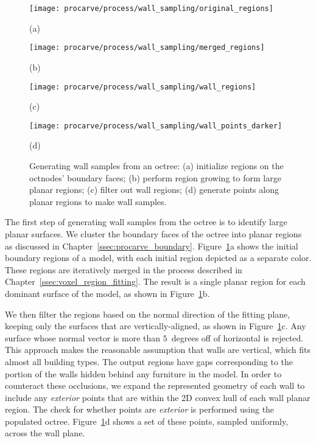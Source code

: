 \documentclass[12pt,onecolumn,oneside]{book}
\begin{document}
\begin{figure}
	\begin{minipage}[t]{0.45\linewidth}
		\centerline{\texttt{[image: procarve/process/wall\_sampling/original\_regions]}}
		\centerline{(a)}
	\end{minipage}
	\hfill
	\begin{minipage}[t]{0.45\linewidth}
		\centerline{\texttt{[image: procarve/process/wall\_sampling/merged\_regions]}}
		\centerline{(b)}
	\end{minipage}
	

	\begin{minipage}[t]{0.45\linewidth}
		\centerline{\texttt{[image: procarve/process/wall\_sampling/wall\_regions]}}
		\centerline{(c)}
	\end{minipage}
	\hfill
	\begin{minipage}[t]{0.45\linewidth}
		\centerline{\texttt{[image: procarve/process/wall\_sampling/wall\_points\_darker]}}
		\centerline{(d)}
	\end{minipage}

	\caption[Generating wall samples from an octree.]{Generating wall samples from an octree: (a) initialize regions on the octnodes' boundary faces; (b) perform region growing to form large planar regions; (c) filter out wall regions; (d) generate points along planar regions to make wall samples.}
	\label{fig:oct2dq}
\end{figure}

The first step of generating wall samples from the octree is to identify large planar surfaces.  We cluster the boundary faces of the octree into planar regions as discussed in Chapter~\ref{ssec:procarve_boundary}.  Figure~\ref{fig:oct2dq}a shows the initial boundary regions of a model, with each initial region depicted as a separate color.  These regions are iteratively merged in the process described in Chapter~\ref{ssec:voxel_region_fitting}.  The result is a single planar region for each dominant surface of the model, as shown in Figure~\ref{fig:oct2dq}b.  

We then filter the regions based on the normal direction of the fitting plane, keeping only the surfaces that are vertically-aligned, as shown in Figure~\ref{fig:oct2dq}c.  Any surface whose normal vector is more than $5$~degrees off of horizontal is rejected.  This approach makes the reasonable assumption that walls are vertical, which fits almost all building types.  The output regions have gaps corresponding to the portion of the walls hidden behind any furniture in the model.  In order to counteract these occlusions, we expand the represented geometry of each wall to include any {\it exterior} points that are within the 2D convex hull of each wall planar region.  The check for whether points are {\it exterior} is performed using the populated octree.  Figure~\ref{fig:oct2dq}d shows a set of these points, sampled uniformly, across the wall plane.  
\end{document}
